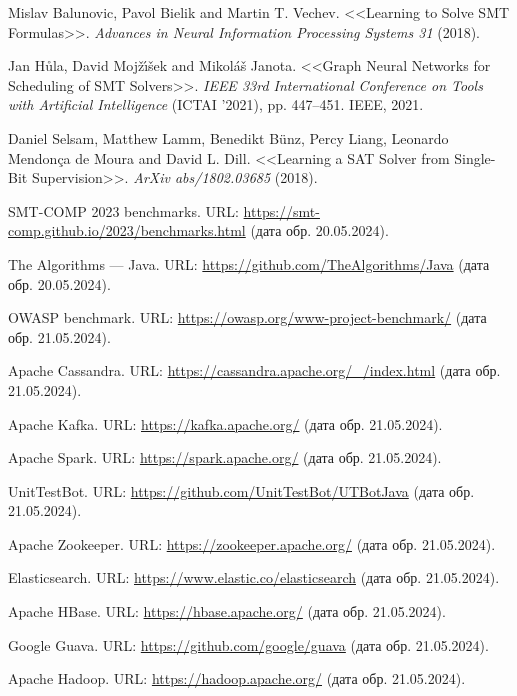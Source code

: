 \begin{thebibliography}{1}
 Mislav Balunovic, Pavol Bielik and Martin T. Vechev. <<Learning to Solve SMT Formulas>>. \textit{Advances in Neural Information Processing Systems 31} (2018).

 Jan H\r{u}la, David Moj\v{z}\'{\i}\v{s}ek and Mikol\'{a}\v{s} Janota. <<Graph Neural Networks for Scheduling of SMT Solvers>>. \textit{IEEE 33rd International Conference on Tools with Artificial Intelligence} (ICTAI '2021), pp. 447--451. IEEE, 2021.

 Daniel Selsam, Matthew Lamm, Benedikt B\"{u}nz, Percy Liang, Leonardo Mendonça de Moura and David L. Dill. <<Learning a SAT Solver from Single-Bit Supervision>>. \textit{ArXiv abs/1802.03685} (2018).

 SMT-COMP 2023 benchmarks. URL: \url{https://smt-comp.github.io/2023/benchmarks.html} (дата обр. 20.05.2024).

 The Algorithms --- Java. URL: \url{https://github.com/TheAlgorithms/Java} (дата обр. 20.05.2024).

 OWASP benchmark. URL: \url{https://owasp.org/www-project-benchmark/} (дата обр. 21.05.2024).

 Apache Cassandra. URL: \url{https://cassandra.apache.org/_/index.html} (дата обр. 21.05.2024).

 Apache Kafka. URL: \url{https://kafka.apache.org/} (дата обр. 21.05.2024).

 Apache Spark. URL: \url{https://spark.apache.org/} (дата обр. 21.05.2024).

 UnitTestBot. URL: \url{https://github.com/UnitTestBot/UTBotJava} (дата обр. 21.05.2024).

 Apache Zookeeper. URL: \url{https://zookeeper.apache.org/} (дата обр. 21.05.2024).

 Elasticsearch. URL: \url{https://www.elastic.co/elasticsearch} (дата обр. 21.05.2024).

 Apache HBase. URL: \url{https://hbase.apache.org/} (дата обр. 21.05.2024).

 Google Guava. URL: \url{https://github.com/google/guava} (дата обр. 21.05.2024).

 Apache Hadoop. URL: \url{https://hadoop.apache.org/} (дата обр. 21.05.2024).



\end{thebibliography}

